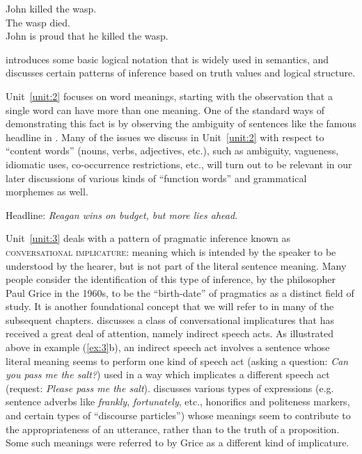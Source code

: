 \ea \label{ex:4}
\ea John killed the wasp.\\
\ex The wasp died.\\
\ex John is proud that he killed the wasp.
                       \z
\z


 introduces some basic logical notation that is widely used in semantics, and discusses certain patterns of inference based on truth values and logical structure.



Unit~\ref{unit:2} focuses on word meanings, starting with the observation that a single word can have more than one meaning. One of the standard ways of demonstrating this fact is by observing the ambiguity of sentences like the famous headline in . Many of the issues we discuss in Unit~\ref{unit:2} with respect to “content words” (nouns, verbs, adjectives, etc.), such as ambiguity, vagueness, idiomatic uses, co-occurrence restrictions, etc., will turn out to be relevant in our later discussions of various kinds of “function words” and grammatical morphemes as well.


\ea \label{ex:5}
Headline: \textit{Reagan wins on budget, but more lies ahead}.
\z


Unit~\ref{unit:3} deals with a pattern of pragmatic inference known as \textsc{conversational implicature}: meaning which is intended by the speaker to be understood by the hearer, but is not part of the literal sentence meaning. Many people consider the identification of this type of inference, by the philosopher Paul Grice in the 1960s, to be the “birth-date” of pragmatics as a distinct field of study. It is another foundational concept that we will refer to in many of the subsequent chapters.  discusses a class of conversational implicatures that has received a great deal of attention, namely indirect speech acts. As illustrated above in example (\ref{ex:3}b), an indirect speech act involves a sentence whose literal meaning seems to perform one kind of speech act (asking a question: \textit{Can you pass me the salt?}) used in a way which implicates a different speech act (request: \textit{Please pass me the salt}).  discusses various types of expressions (e.g. sentence adverbs like \textit{frankly}, \textit{fortunately}, etc., honorifics and politeness markers, and certain types of “discourse particles”) whose meanings seem to contribute to the appropriateness of an utterance, rather than to the truth of a proposition. Some such meanings were referred to by Grice as a different kind of implicature.



